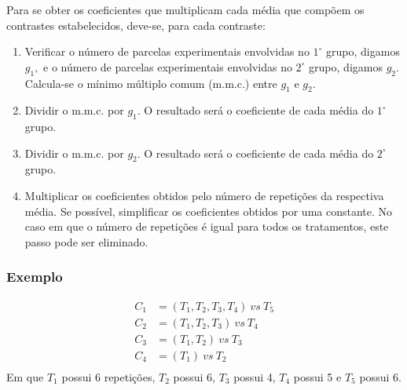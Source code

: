 \documentclass[14pt,aspectratio=1610]{beamer}
\begin{document}
\begin{frame}{}
\frametitle{}
\begin{block}{}
\justifying
Para se obter os coeficientes que multiplicam cada média que compõem os contrastes estabelecidos, deve-se, para cada contraste:
\begin{enumerate}
\item Verificar o número de parcelas experimentais envolvidas no $1^{\circ}$ grupo, digamos $g_{1},$ e o número de parcelas experimentais envolvidas no $2^{\circ}$ grupo, digamos $g_2.$ Calcula-se o mínimo múltiplo comum (m.m.c.) entre $g_1$ e $g_2.$ \pause
\item Dividir o m.m.c. por $g_1.$ O resultado será o coeficiente de cada média do $1^{\circ}$ grupo. \pause
\item Dividir o m.m.c. por $g_2.$ O resultado será o coeficiente de cada média do $2^{\circ}$ grupo. \pause
\item Multiplicar os coeficientes obtidos pelo número de repetições da respectiva média. Se possível, simplificar os coeficientes obtidos por uma constante. No caso em que o
número de repetições é igual para todos os tratamentos, este passo pode ser eliminado.
\end{enumerate}
\end{block}
\end{frame}

\begin{frame}{}
\frametitle{Exemplo}
\begin{block}{}
\justifying
\begin{align*}
C_{1}&=(T_{1},T_{2},T_{3},T_{4})\ vs\ T_{5}\\
C_{2}&=(T_{1},T_{2},T_{3})\ vs\ T_{4}\\
C_{3}&=(T_{1},T_{2})\ vs\ T_{3}\\
C_{4}&=(T_{1})\ vs\ T_{2}\\
\end{align*}
Em que $T_{1}$ possui 6 repetições, $T_{2}$ possui 6, $T_{3}$ possui 4, $T_{4}$ possui 5 e $T_{5}$ possui 6.
\end{block}
\end{frame}
\end{document}
